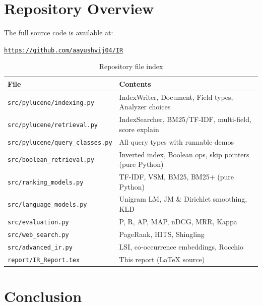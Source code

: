 \documentclass[11pt,a4paper]{article}
\begin{document}
\section{Repository Overview}

The full source code is available at:
\begin{center}
  \href{https://github.com/aayushvij04/IR}{\texttt{https://github.com/aayushvij04/IR}}
\end{center}

\begin{table}[h]
\centering
\small
\begin{tabular}{@{}ll@{}}
\toprule
\textbf{File} & \textbf{Contents} \\
\midrule
\texttt{src/pylucene/indexing.py}     & IndexWriter, Document, Field types, Analyzer choices \\
\texttt{src/pylucene/retrieval.py}    & IndexSearcher, BM25/TF-IDF, multi-field, score explain \\
\texttt{src/pylucene/query\_classes.py} & All query types with runnable demos \\
\texttt{src/boolean\_retrieval.py}    & Inverted index, Boolean ops, skip pointers (pure Python) \\
\texttt{src/ranking\_models.py}       & TF-IDF, VSM, BM25, BM25+ (pure Python) \\
\texttt{src/language\_models.py}      & Unigram LM, JM \& Dirichlet smoothing, KLD \\
\texttt{src/evaluation.py}            & P, R, AP, MAP, nDCG, MRR, Kappa \\
\texttt{src/web\_search.py}           & PageRank, HITS, Shingling \\
\texttt{src/advanced\_ir.py}          & LSI, co-occurrence embeddings, Rocchio \\
\texttt{report/IR\_Report.tex}        & This report (LaTeX source) \\
\bottomrule
\end{tabular}
\caption{Repository file index}
\end{table}

\section{Conclusion}
\end{document}
